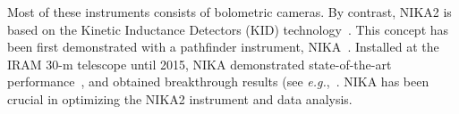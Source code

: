 Most of these instruments consists of bolometric cameras. By contrast,
NIKA2 is based on the Kinetic Inductance Detectors (KID)
technology~\citep{Day2003, Doyle2008_LEKID, Shu2018_LEKID}. This concept has been
first demonstrated with a pathfinder instrument,
NIKA~\citep{Monfardini2010_NIKA, Monfardini2011_NIKA}.
Installed at the IRAM 30-m telescope until 2015, NIKA demonstrated
state-of-the-art performance~\citep{Catalano2014}, and obtained
breakthrough results
(see \emph{e.g.},~\citet{Adam2014, Adam2017_kSZ}.
NIKA has been crucial in optimizing the NIKA2 instrument and data
analysis. 

%

